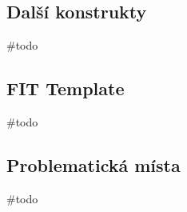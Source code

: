 \subsection{Další konstrukty}

\#todo

\subsection{FIT Template}

\#todo

\subsection{Problematická místa}

\#todo
